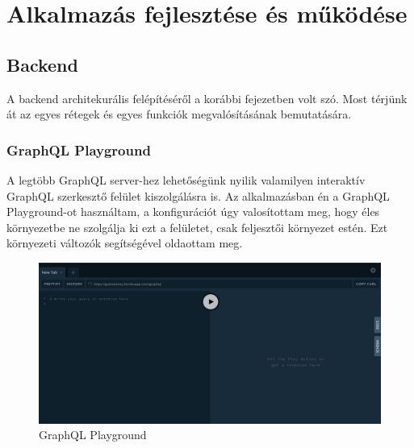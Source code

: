 
\chapter{Alkalmazás fejlesztése és működése}

\section{Backend}
A backend architekurális felépítéséről a korábbi fejezetben volt szó. 
Most térjünk át az egyes rétegek és egyes funkciók megvalósításának bemutatására.

\subsection{GraphQL Playground}
A legtöbb GraphQL server-hez lehetőségünk nyilik valamilyen interaktív GraphQL szerkesztő felület kiszolgálásra is.
Az alkalmazásban én a GraphQL Playground-ot használtam, a konfigurációt úgy valosítottam meg, hogy éles környezetbe ne szolgálja ki ezt a felületet, csak feljesztői környezet estén.
Ezt környezeti változók segítségével oldaottam meg.

\begin{figure}[!ht]
  \centering
  \includegraphics[width=150mm, keepaspectratio]{figures/playground.png}
  \caption{GraphQL Playground}
  \label{fig:playground}
\end{figure}

